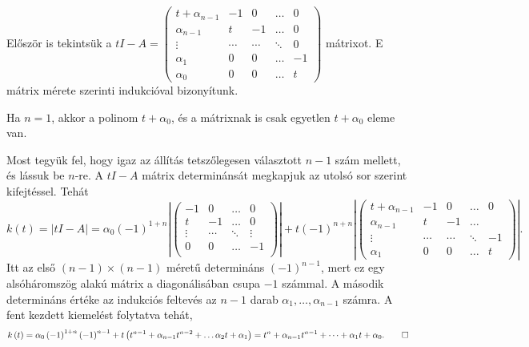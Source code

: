 \documentclass[9pt, a4paper, showtrims]{memoir}
\makeatletter
\renewenvironment{proof}[1][\proofname]
    {\par\pushQED{\qed}%
    \normalfont \topsep6\p@\@plus6\p@\relax
    \trivlist
    \item[\hskip\labelsep
        \itshape
    #1\@addpunct{:}]\ignorespaces}
    {\popQED\endtrivlist\@endpefalse}
\theoremstyle{plain}
\theoremstyle{remark}
\theoremstyle{definition}
\makeatother
\begin{document}
\begin{proof}
    Először is tekintsük a 
    \(
        tI-A=
        \begin{pmatrix}
            t+\alpha_{n-1}&-1&0&\dots&0\\
            \alpha_{n-1}&t&-1&\dots&0\\
            \vdots&\cdots&\cdots&\ddots&0\\
            \alpha_1&0&0&\dots&-1\\
            \alpha_0&0&0&\dots&t
        \end{pmatrix}
    \) mátrixot.
    E mátrix mérete szerinti indukcióval bizonyítunk.

    Ha $n=1$, akkor a polinom $t+\alpha_0$, és a mátrixnak is csak egyetlen $t+\alpha_0$ eleme van.

    Most tegyük fel, hogy igaz az állítás tetszőlegesen választott $n-1$ szám mellett, és lássuk be $n$-re.
    A $tI-A$ mátrix determinánsát megkapjuk az utolsó sor szerint kifejtéssel.
    Tehát
    \[
        k\left( t \right)=
        |tI-A|=
        \alpha_0
        \left( -1 \right)^{1+n}
        \left|
        \begin{pmatrix}
            -1&0&\dots&0\\
            t&-1&\dots&0\\
            \vdots&\cdots&\ddots&\vdots\\
            0&0&\dots&-1\\
        \end{pmatrix}
        \right|
        +t\left( -1 \right)^{n+n}
        \left|
        \begin{pmatrix}
            t+\alpha_{n-1}&-1&0&\dots&0\\
            \alpha_{n-1}&t&-1&\dots&\\
            \vdots&\cdots&\cdots&\ddots&-1\\
            \alpha_1&0&0&\dots&t
        \end{pmatrix}
        \right|.
    \]
    Itt az első $\left( n-1 \right)\times \left( n-1 \right)$ méretű determináns $\left( -1 \right)^{n-1}$, 
    mert ez egy alsóháromszög alakú mátrix a diagonálisában csupa $-1$ számmal.
    A második determináns értéke az indukciós feltevés az $n-1$ darab
    $ \alpha_1,\dots, \alpha_{n-1}$ számra.
    A fent kezdett kiemelést folytatva tehát,
    \[
        k\left( t \right)
        =
        \alpha_0
        \left( -1 \right)^{1+n}\left( -1 \right)^{n-1}
        +t\left( 
        t^{n-1}+\alpha_{n-1}t^{n-2}+\dots\alpha_2t+\alpha_1
        \right)
        =
        t^n+\alpha_{n-1}t^{n-1}+\dots+\alpha_1t+\alpha_0.\qedhere
    \]
\end{proof}
\end{document}
